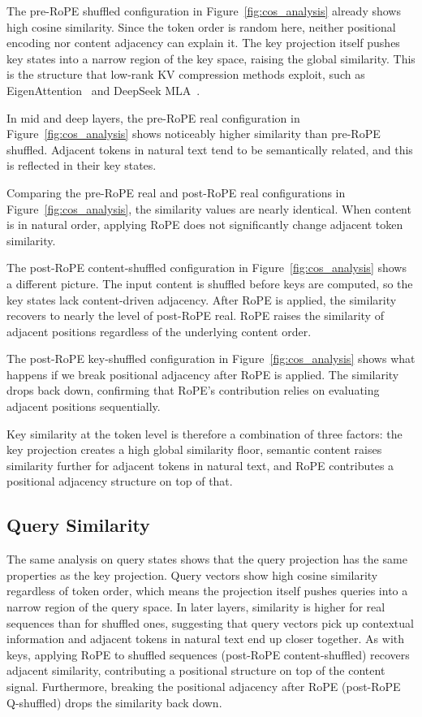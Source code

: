 

The pre-RoPE shuffled configuration in Figure~\ref{fig:cos_analysis} already shows high cosine similarity.
Since the token order is random here, neither positional encoding nor content adjacency can explain it.
The key projection itself pushes key states into a narrow region of the key space, raising the global similarity.
This is the structure that low-rank KV compression methods exploit, such as EigenAttention~\citep{saxena2024eigenattention} and DeepSeek MLA~\citep{deepseekai2024deepseekv2}.

In mid and deep layers, the pre-RoPE real configuration in Figure~\ref{fig:cos_analysis} shows noticeably higher similarity than pre-RoPE shuffled.
Adjacent tokens in natural text tend to be semantically related, and this is reflected in their key states.

Comparing the pre-RoPE real and post-RoPE real configurations in Figure~\ref{fig:cos_analysis}, the similarity values are nearly identical.
When content is in natural order, applying RoPE does not significantly change adjacent token similarity.

The post-RoPE content-shuffled configuration in Figure~\ref{fig:cos_analysis} shows a different picture.
The input content is shuffled before keys are computed, so the key states lack content-driven adjacency.
After RoPE is applied, the similarity recovers to nearly the level of post-RoPE real.
RoPE raises the similarity of adjacent positions regardless of the underlying content order.

The post-RoPE key-shuffled configuration in Figure~\ref{fig:cos_analysis} shows what happens if we break positional adjacency after RoPE is applied. The similarity drops back down, confirming that RoPE's contribution relies on evaluating adjacent positions sequentially.

Key similarity at the token level is therefore a combination of three factors: the key projection creates a high global similarity floor, semantic content raises similarity further for adjacent tokens in natural text, and RoPE contributes a positional adjacency structure on top of that.

\subsection{Query Similarity}

The same analysis on query states shows that the query projection has the same properties as the key projection.
Query vectors show high cosine similarity regardless of token order, which means the projection itself pushes queries into a narrow region of the query space.
In later layers, similarity is higher for real sequences than for shuffled ones, suggesting that query vectors pick up contextual information and adjacent tokens in natural text end up closer together.
As with keys, applying RoPE to shuffled sequences (post-RoPE content-shuffled) recovers adjacent similarity, contributing a positional structure on top of the content signal. Furthermore, breaking the positional adjacency after RoPE (post-RoPE Q-shuffled) drops the similarity back down.


